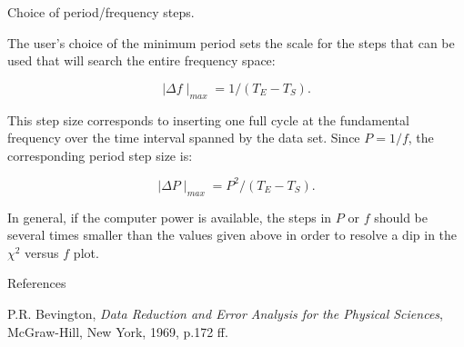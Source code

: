 \@{Choice of period/frequency steps.}

The user's choice of the minimum period sets the scale for the 
steps that can be used that will search the entire frequency space:

$$\mid\Delta f\mid_{max} = 1/(T_{E}-T_{S}).$$

This step size corresponds to inserting one full cycle at the
fundamental frequency over the time interval spanned by the data set.
Since $P = 1/f$, the corresponding period step size is:

$$\mid\Delta P\mid_{max} = P^{2}/(T_{E}-T_{S}).$$

In general, if the computer power is available, the steps in $P$ or $f$
should be several times smaller than the values given above in order
to resolve a dip in the $\chi^{2}$ versus $f$ plot.

\@{References}

P.R. Bevington, {\it Data Reduction and Error Analysis for the
Physical Sciences}, McGraw-Hill, New York, 1969, p.172 ff.

\vfill\eject


